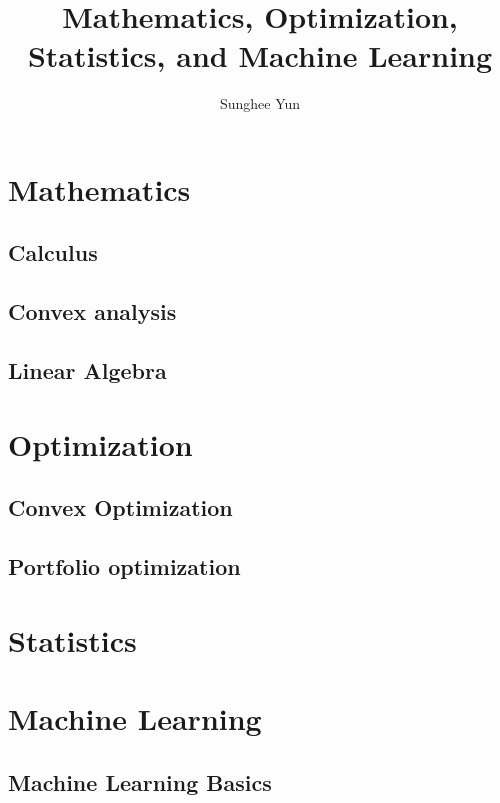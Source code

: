 \documentclass[10pt, twoside]{book}   	%
\title{Mathematics, Optimization, Statistics, and Machine Learning}
\author{Sunghee Yun}
\begin{document}
\maketitle

\setcounter{secnumdepth}{4}
\setcounter{tocdepth}{3}
\tableofcontents


\part{Mathematics}

\chapter{Calculus}


\chapter{Convex analysis}


\chapter{Linear Algebra}



\part{Optimization}

\chapter{Convex Optimization}


\chapter{Portfolio optimization}



\part{Statistics}



\part{Machine Learning}

\chapter{Machine Learning Basics}

\end{document}

